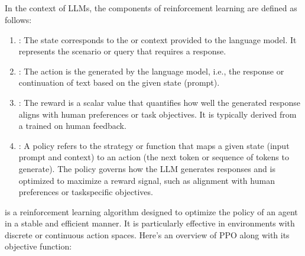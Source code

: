 \documentclass[letterpaper,11pt,english]{sphinxmanual}
\begin{document}
\subsection{}
\label{\detokenize{rlhf:state-action-and-reward-in-the-context-of-llms}}
\sphinxAtStartPar
In the context of LLMs, the components of reinforcement learning are
defined as follows:
\begin{enumerate}
%
\item {} 
\sphinxAtStartPar
{}: The state corresponds to the  or context
provided to the language model. It represents the scenario or query
that requires a response.

\item {} 
\sphinxAtStartPar
{}: The action is the  generated by the language
model, i.e., the response or continuation of text based on the given
state (prompt).

\item {} 
\sphinxAtStartPar
{}: The reward is a scalar value that quantifies how well the
generated response aligns with human preferences or task objectives.
It is typically derived from a  trained on human
feedback.

\item {} 
\sphinxAtStartPar
{}: A policy refers to the strategy or function that maps a
given state (input prompt and context) to an action (the next token
or sequence of tokens to generate). The policy governs how the LLM
generates responses and is optimized to maximize a reward signal,
such as alignment with human preferences or task\sphinxhyphen{}specific objectives.

\end{enumerate}

\sphinxAtStartPar
{} is a reinforcement learning
algorithm designed to optimize the policy of an agent in a stable and
efficient manner. It is particularly effective in environments with
discrete or continuous action spaces. Here’s an overview of PPO along
with its objective function:
\end{document}
